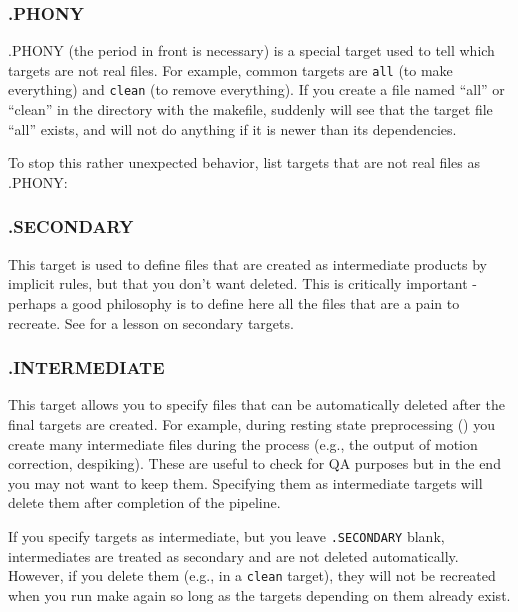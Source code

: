 \subsubsection{.PHONY}
.PHONY (the period in front is necessary) is a special target used to tell \maken{} which targets are not real files. For example, common targets are \texttt{all} (to make everything) and \texttt{clean} (to remove everything). If you create a file named ``all'' or ``clean'' in the directory with the makefile, suddenly \maken{} will see that the target file ``all'' exists, and will not do anything if it is newer than its dependencies.

To stop this rather unexpected behavior, list targets that are not real files as .PHONY:


\subsubsection{.SECONDARY}
This target is used to define files that are created as intermediate products by implicit rules, but that you don't want deleted. This is critically important - perhaps a good philosophy is to define here all the files that are a pain to recreate. See  for a lesson on secondary targets. 

\subsubsection{.INTERMEDIATE}
This target allows you to specify files that can be automatically deleted after the final targets are created. For example, during resting state preprocessing () you create many intermediate files during the process (e.g., the output of motion correction, despiking). These are useful to check for QA purposes but in the end you may not want to keep them. Specifying them as intermediate targets will delete them after completion of the pipeline.

If you specify targets as intermediate, but you leave \texttt{.SECONDARY} blank, intermediates are treated as secondary and are not deleted automatically.  However, if you delete them (e.g., in a \texttt{clean} target), they will not be recreated when you run make again so long as the targets depending on them already exist.




